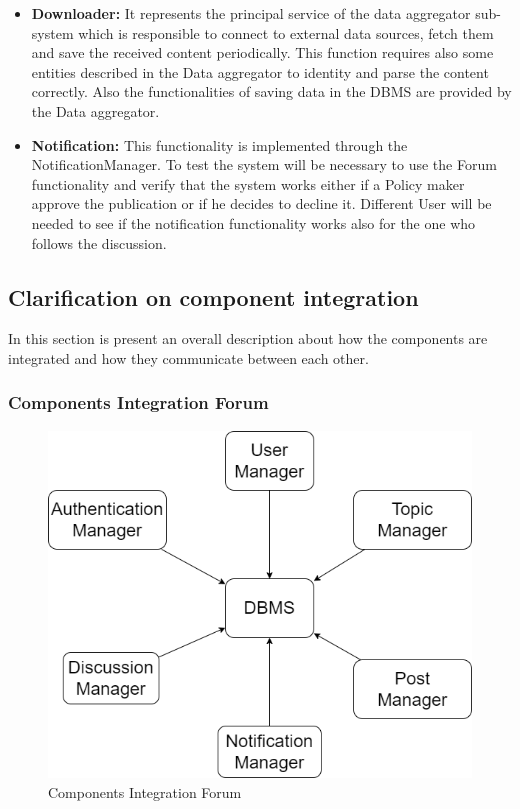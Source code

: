 \begin{itemize}
    \item \textbf{Downloader:} It represents the principal service of the data aggregator sub-system which is responsible to connect to external data sources, fetch them and save the received content periodically.
    This function requires also some entities described in the Data aggregator to identity and parse the content correctly. Also the functionalities of saving data in the DBMS are provided by the Data aggregator.
    
    \item \textbf{Notification:} This functionality is implemented through the NotificationManager. To test the system will be necessary to use the Forum functionality and verify that the system works either if a Policy maker approve the publication or if he decides to decline it. Different User will be needed to see if the notification functionality works also for the one who follows the discussion.
\end{itemize}

\subsection{Clarification on component integration}
In this section is present an overall description about how the components are integrated and how they communicate between each other.\\

\subsubsection{Components Integration Forum}
\begin{figure}[h!]
        \centering
        \includegraphics[scale=0.5]{images/component_integration/components_integration_forum.png}
        \caption{Components Integration Forum}
        \label{fig:components_integration_forum}
\end{figure}
\FloatBarrier

